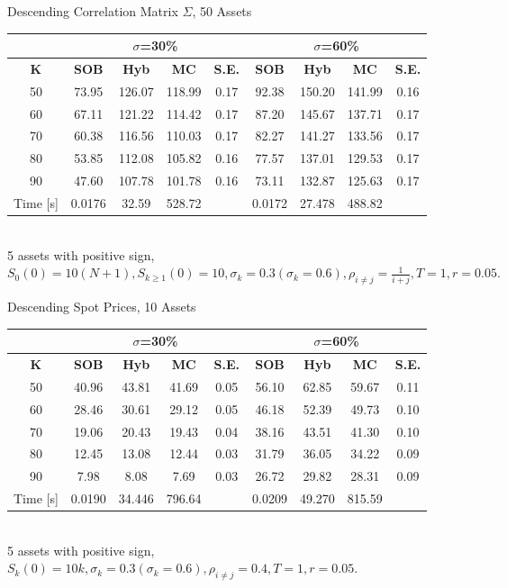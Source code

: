 \documentclass[a4paper]{article}
\begin{document}
\begin {table}
\caption {Descending Correlation Matrix $\Sigma$, 50 Assets} 
\begin{center}
\begin{tabular}{c|c c c  c|c c c c}
\hline
\multicolumn{1}{c|}{} & \multicolumn{4}{|c|}{$\sigma$=30\%} & \multicolumn{4}{|c}{$\sigma$=60\%} \\ 
\hline
  \textbf{K} & \textbf{SOB} & \textbf{Hyb}	& \textbf{MC}& \textbf{S.E.} & \textbf{SOB} & \textbf{Hyb} & \textbf{MC}& \textbf{S.E.} \\
50 &73.95&126.07&118.99&0.17& 92.38 &  150.20&141.99 &0.16  \\
60 &67.11&121.22&114.42&0.17& 87.20&  145.67&137.71 &0.17\\
70 &60.38&116.56&110.03&0.17& 82.27& 141.27 & 133.56 &0.17\\
80 &53.85&112.08&105.82& 0.16& 77.57& 137.01& 129.53 &0.17\\
90 &47.60&107.78&101.78& 0.16& 73.11&  132.87& 125.63 &0.17\\
\hline
Time [s] &0.0176 &32.59 &528.72 & &0.0172 &27.478&488.82 \\
\hline
\end{tabular}
\\[8pt]
\caption*{5 assets with positive sign, $S_0(0)=10(N+1), S_{k\geq1}(0) = 10, \sigma_k = 0.3 (\sigma_k = 0.6), \rho_{i\neq j} = \frac{1}{i+j}, T = 1, r=0.05.$}
\end{center}
\end{table}

\begin {table}
\caption {Descending Spot Prices, 10 Assets} 
\begin{center}
\begin{tabular}{c|c c c c|c c c c}
\hline
\multicolumn{1}{c|}{} & \multicolumn{4}{|c|}{$\sigma$=30\%} & \multicolumn{4}{|c}{$\sigma$=60\%} \\ 
\hline
  \textbf{K} & \textbf{SOB} & \textbf{Hyb}	& \textbf{MC}& \textbf{S.E.} & \textbf{SOB} & \textbf{Hyb} & \textbf{MC} & \textbf{S.E.} \\
50 &40.96&43.81&41.69& 0.05& 56.10& 62.85&59.67 & 0.11\\
60 &28.46&30.61& 29.12& 0.05&46.18& 52.39&49.73&0.10\\
70 &19.06&20.43& 19.43& 0.04& 38.16&43.51&41.30&0.10\\
80 &12.45&13.08& 12.44& 0.03 & 31.79&36.05& 34.22& 0.09 \\
90 &7.98& 8.08&7.69 & 0.03& 26.72&29.82&28.31&0.09\\

\hline
Time [s]& 0.0190&34.446& 796.64 & & 0.0209& 49.270&815.59 & \\
\hline
\end{tabular}
\\[8pt]
\caption*{5 assets with positive sign, $S_k(0)=10k, \sigma_k = 0.3 (\sigma_k = 0.6), \rho_{i\neq j} = 0.4, T = 1, r=0.05.$}
\end{center}
\end{table}
\end{document}
